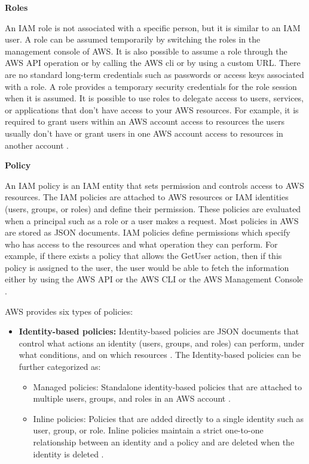 \textbf{Roles}
\par An IAM role is not associated with a specific person,
but it is similar to an IAM user.
A role can be assumed
temporarily by switching the roles in the management
console of AWS. It is also possible to assume a role
through the AWS API operation or by calling the AWS
\gls{cli}
or by using a custom URL.
There are no standard long-term credentials such as passwords or access keys associated with a role.
A role provides a temporary security credentials for the role session when it is assumed.
It is possible to use roles to delegate access to users, services, or applications that don't have access to your AWS resources. For example, it is required to grant users within an AWS account access to resources the users usually don’t have or grant users in one AWS account access to resources in another account \cite{27}.

\hfill \break
\textbf{Policy}

\par An IAM policy is an IAM entity that sets permission and controls access to AWS resources.
The IAM policies are attached to AWS resources or IAM identities (users, groups, or roles) and define their permission.
These policies are evaluated when a principal such as a role or a user makes a request. Most policies in AWS are stored as JSON documents. IAM policies define permissions which specify who has access to the resources and what operation they can perform. For example, if there exists a policy that allows the GetUser action, then if this policy is assigned to the user, the user would be able to fetch the information either by using the AWS API or the AWS CLI or the AWS Management Console \cite{14}.

\par AWS provides six types of policies:

\begin{itemize}
    \item \textbf{Identity-based policies:} Identity-based policies are JSON documents that control what actions an
    identity
    (users, groups, and roles) can perform, under what conditions, and on which resources \cite{27}. The Identity-based policies can be further categorized as:
    \begin{itemize}
        \item Managed policies: Standalone identity-based policies that are attached to multiple users, groups, and
        roles in an AWS account \cite{27}.
    \end{itemize}
    \begin{itemize}
        \item Inline policies:  Policies that are added directly to a single identity such as user, group, or role.
        Inline policies maintain a strict one-to-one relationship between an identity and a policy and are deleted when the identity is deleted \cite{27}.
    \end{itemize}
\end{itemize}

